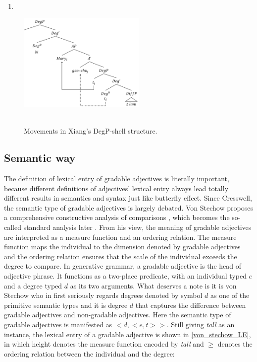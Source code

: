 \documentclass{ctexart}
\let \cite \parencite
\begin{document}
\begin{enumerate}
    \item \label{xiang_structure}
\end{enumerate}

\begin{figure}[H]
    \centering
    \includegraphics[width=0.55\textwidth]{pic/xiang.png}
    \begin{caption}
        \\ \vspace{-1.1ex}
        Movements in Xiang's DegP-shell structure.
    \end{caption}
\end{figure}


\subsection{Semantic way}

The definition of lexical entry of gradable adjectives is literally important, because different definitions of adjectives' lexical entry always lead totally different results in semantics and syntax just like butterfly effect. Since Cresswell, the semantic type of gradable adjectives is largely debated. Von Stechow proposes a comprehensive constructive analysis of comparisons \cite{von1984a}, which becomes the so-called standard analysis later \cite{bale2011}. From his view, the meaning of gradable adjectives are interpreted as a measure function and an ordering relation. The measure function maps the individual to the dimension denoted by gradable adjectives and the ordering relation ensures that the scale of the individual exceeds the degree to compare. In generative grammar, a gradable adjective is the head of adjective phrase. It functions as a two-place predicate, with an individual typed $e$ and a degree typed $d$ as its two arguments. What deserves a note is it is von Stechow who in first seriously regards degrees denoted by symbol $d$ as one of the primitive semantic types and it is degree $d$ that captures the difference between gradable adjectives and non-gradable adjectives. Here the semantic type of gradable adjectives is manifested as $<d,<e,t>>$. Still giving \textit{tall} as an instance, the lexical entry of a gradable adjective is shown in \ref{von_stechow_LE}, in which height denotes the measure function encoded by \textit{tall} and $\geq$ denotes the ordering relation between the individual and the degree:
\end{document}
